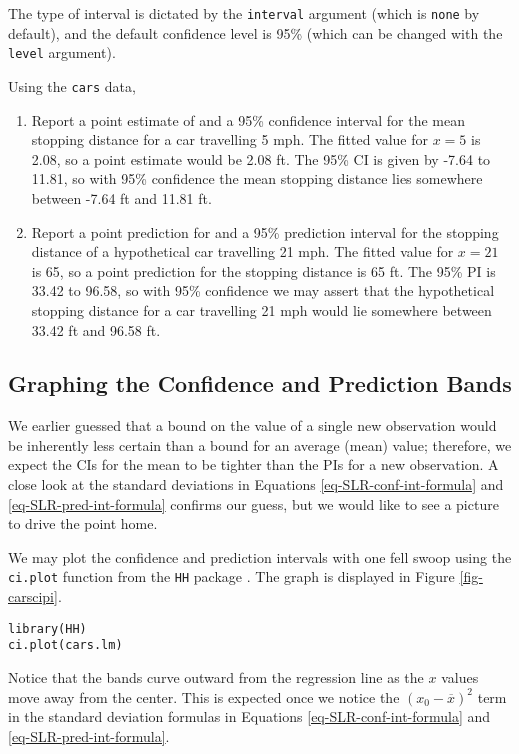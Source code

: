 The type of interval is dictated by the \texttt{interval} argument (which is
\texttt{none} by default), and the default confidence level is 95\% (which
can be changed with the \texttt{level} argument).


Using the \texttt{cars} data,
\begin{enumerate}
\item Report a point estimate of and a 95\% confidence interval for the
mean stopping distance for a car travelling 5 mph.  The fitted
value for \(x = 5\) is 2.08, so a point
estimate would be 2.08 ft. The 95\% CI is
given by -7.64 to 11.81, so
with 95\% confidence the mean stopping distance lies somewhere
between -7.64 ft and 11.81 ft.
\item Report a point prediction for and a 95\% prediction interval for the
stopping distance of a hypothetical car travelling 21 mph.  The
fitted value for \(x = 21\) is 65, so a point
prediction for the stopping distance is 65 ft. The
95\% PI is 33.42 to 96.58, so with
95\% confidence we may assert that the hypothetical stopping
distance for a car travelling 21 mph would lie somewhere between
33.42 ft and 96.58 ft.
\end{enumerate}

\subsection{Graphing the Confidence and Prediction Bands}
\label{sec-11-2-6}

We earlier guessed that a bound on the value of a single new
observation would be inherently less certain than a bound for an
average (mean) value; therefore, we expect the CIs for the mean to be
tighter than the PIs for a new observation. A close look at the
standard deviations in Equations \eqref{eq-SLR-conf-int-formula} and
\eqref{eq-SLR-pred-int-formula} confirms our guess, but we would like
to see a picture to drive the point home.

We may plot the confidence and prediction intervals with one fell
swoop using the \texttt{ci.plot} function from the \texttt{HH} package
\cite{HH}. The graph is displayed in Figure \ref{fig-carscipi}.

\begin{verbatim}
library(HH)
ci.plot(cars.lm)
\end{verbatim}

Notice that the bands curve outward from the regression line as the
\(x\) values move away from the center. This is expected once we
notice the \((x_{0}-\overline{x})^{2}\) term in the standard deviation
formulas in Equations \eqref{eq-SLR-conf-int-formula} and
\eqref{eq-SLR-pred-int-formula}.

